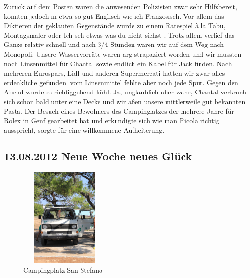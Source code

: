 Zurück auf dem Posten waren die anwesenden Polizisten zwar sehr Hilfsbereit, konnten jedoch in etwa so gut Englisch wie ich Französisch.
Vor allem das Diktieren der geklauten Gegenstände wurde zu einem Ratespiel \`a la Tabu, Montagsmaler oder \glqq Ich seh etwas was du nicht siehst \grqq.
Trotz allem verlief das Ganze relativ schnell und nach 3/4 Stunden waren wir auf dem Weg nach Monopoli.
Unsere Wasservorräte waren arg strapaziert worden und wir mussten noch Linsenmittel für Chantal sowie endlich ein Kabel für Jack finden.
Nach mehreren Eurospars, Lidl und anderen Supermercati hatten wir zwar alles erdenkliche gefunden, vom Linsenmittel fehlte aber noch jede Spur.
Gegen den Abend wurde es richtiggehend kühl.
Ja, unglaublich aber wahr, Chantal verkroch sich schon bald unter eine Decke und wir aßen unsere mittlerweile gut bekannten Pasta.
Der Besuch eines Bewohners des Campinglatzes der mehrere Jahre für Rolex in Genf gearbeitet hat und erkundigte sich wie man Ricola richtig ausspricht, sorgte für eine willkommene Aufheiterung.

\subsection{13.08.2012 Neue Woche neues Glück}

\begin{figure} 
  \begin{centering}
    \includegraphics[width=0.4\textwidth, height=5cm, keepaspectratio]{../Bilder/Sommer2012/60.jpg}
    \caption{Campingplatz San Stefano}
  \end{centering}
\end{figure} 

